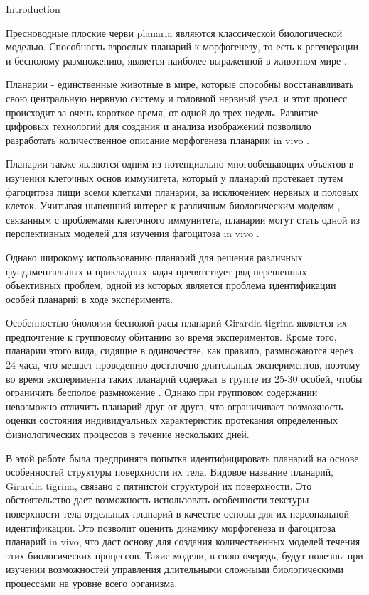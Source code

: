 \documentclass{article}
\begin{document}
\begin{section}{Introduction}

Пресноводные плоские черви planaria являются классической биологической моделью. Способность взрослых планарий к морфогенезу, то есть к регенерации и бесполому
размножению, является наиболее выраженной в
животном мире \cite{int1} \cite{int2}. 


Планарии - единственные животные в мире, которые способны восстанавливать свою центральную нервную систему и головной нервный узел, и этот процесс происходит за очень короткое время, от одной до трех недель. \cite{int9} \cite{int10}
Развитие цифровых технологий для создания и
анализа изображений позволило разработать
количественное описание морфогенеза планарии in vivo \cite{int3} \cite{int4}.


Планарии также являются одним из потенциально многообещающих
объектов в изучении клеточных основ иммунитета,
который у планарий протекает путем фагоцитоза пищи
всеми клетками планарии, за исключением нервных и половых клеток. \cite{int11} 
Учитывая нынешний интерес к различным биологическим моделям
, связанным с проблемами клеточного иммунитета, планарии могут стать одной из перспективных моделей для изучения фагоцитоза in vivo \cite{int5} \cite{int6} \cite{int7}.


Однако широкому использованию планарий для
решения различных фундаментальных и прикладных
задач препятствует ряд нерешенных объективных проблем,
одной из которых является проблема идентификации
особей планарий в ходе эксперимента. \cite{int12}
\cite{int13}

Особенностью биологии бесполой расы планарий
Girardia tigrina является их предпочтение к групповому обитанию
во время экспериментов.  \cite{int14}
Кроме того, планарии этого вида, сидящие в одиночестве, как правило, размножаются через 24 часа, что мешает проведению достаточно длительных
экспериментов, поэтому во время эксперимента таких
планарий содержат в группе из 25-30 особей, чтобы
ограничить бесполое размножение \cite{int8} \cite{int5}.
Однако при групповом содержании невозможно отличить планарий друг от друга, что ограничивает возможность оценки состояния индивидуальных характеристик протекания определенных физиологических процессов в течение нескольких дней. \cite{int15} \cite{int16}


В этой работе была предпринята попытка идентифицировать планарий на
основе особенностей структуры поверхности их тела. 
Видовое название планарий, Girardia
tigrina, связано с пятнистой структурой их поверхности. \cite{int17} Это обстоятельство дает возможность использовать особенности текстуры поверхности тела отдельных планарий в качестве основы для их
персональной идентификации. \cite{int18} \cite{int19}
Это позволит оценить динамику морфогенеза и
фагоцитоза планарий in vivo, что даст основу для создания количественных моделей течения этих биологических процессов. \cite{int20} \cite{int21}
Такие модели, в свою очередь,
будут полезны при изучении возможностей управления
длительными сложными биологическими процессами на уровне
всего организма. \cite{int22}


\end{section}
\end{document}
